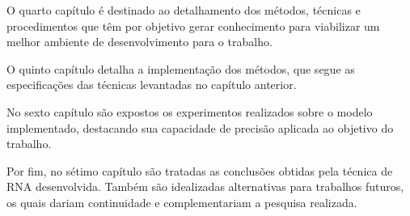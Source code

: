 O quarto capítulo é destinado ao detalhamento dos métodos, técnicas e procedimentos que têm por objetivo gerar conhecimento para viabilizar um melhor ambiente de desenvolvimento para o trabalho.

O quinto capítulo detalha a implementação dos métodos, que segue as especificações das técnicas levantadas no capítulo anterior.

No sexto capítulo são expostos os experimentos realizados sobre o modelo implementado, destacando sua capacidade de precisão aplicada ao objetivo do trabalho.

Por fim, no sétimo capítulo são tratadas as conclusões obtidas pela técnica de RNA desenvolvida. Também são idealizadas alternativas para trabalhos futuros, os quais dariam continuidade e complementariam a pesquisa realizada.